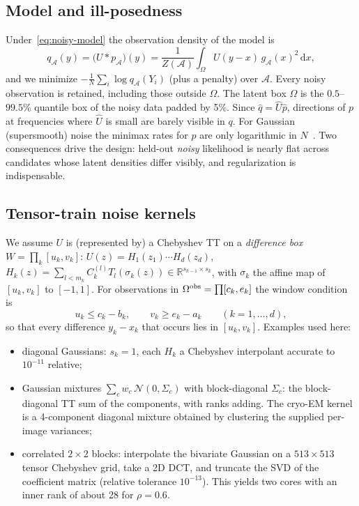 \documentclass[11pt]{article}
\theoremstyle{definition}
\theoremstyle{remark}
\newcommand{\R}{\mathbb{R}}
\newcommand{\dd}{\,\mathrm{d}}
\begin{document}
\subsection{Model and ill-posedness}
Under~\eqref{eq:noisy-model} the observation density of the model is
\begin{equation}\label{eq:q}
  q_{\mathcal A}(y)=\bigl(U*p_{\mathcal A}\bigr)(y)=\frac1{Z(\mathcal A)}\int_\Omega U(y-x)\,g_{\mathcal A}(x)^2\dd x,
\end{equation}
and we minimize $-\frac1N\sum_i\log q_{\mathcal A}(Y_i)$ (plus a penalty) over $\mathcal A$. Every noisy observation
is retained, including those outside $\Omega$. The latent box $\Omega$ is the $0.5$--$99.5\%$ quantile box of the
noisy data padded by 5\%. Since $\hat q=\hat U\hat p$, directions of $p$ at frequencies where $\hat U$ is small are
barely visible in $q$. For Gaussian (supersmooth) noise the minimax rates for $p$ are only logarithmic in
$N$~\cite{fan1991optimal,carroll1988optimal,stefanski1990deconvolving}. Two consequences drive the design:
held-out \emph{noisy} likelihood is nearly flat across candidates whose latent densities differ visibly, and
regularization is indispensable.

\subsection{Tensor-train noise kernels}
We assume $U$ is (represented by) a Chebyshev TT on a \emph{difference box} $W=\prod_k[u_k,v_k]$:
$U(z)=H_1(z_1)\cdots H_d(z_d)$, $H_k(z)=\sum_{l<m_k}C_k^{(l)}T_l(\sigma_k(z))\in\R^{s_{k-1}\times s_k}$, with
$\sigma_k$ the affine map of $[u_k,v_k]$ to $[-1,1]$. For observations in $\Omega^{\rm obs}=\prod[c_k,e_k]$ the
window condition is
\begin{equation}\label{eq:window}
  u_k\le c_k-b_k,\qquad v_k\ge e_k-a_k\qquad(k=1,\dots,d),
\end{equation}
so that every difference $y_k-x_k$ that occurs lies in $[u_k,v_k]$. Examples used here:
\begin{itemize}[leftmargin=2em,itemsep=1pt]
  \item diagonal Gaussians: $s_k=1$, each $H_k$ a Chebyshev interpolant accurate to $10^{-11}$ relative;
  \item Gaussian mixtures $\sum_c w_c\,\mathcal N(0,\Sigma_c)$ with block-diagonal $\Sigma_c$: the block-diagonal TT sum of
  the components, with ranks adding. The cryo-EM kernel is a 4-component diagonal mixture obtained by clustering
  the supplied per-image variances;
  \item correlated $2\times2$ blocks: interpolate the bivariate Gaussian on a $513\times513$ tensor Chebyshev grid,
  take a 2D DCT, and truncate the SVD of the coefficient matrix (relative tolerance $10^{-13}$). This yields two cores
  with an inner rank of about 28 for $\rho=0.6$.
\end{itemize}
\end{document}
